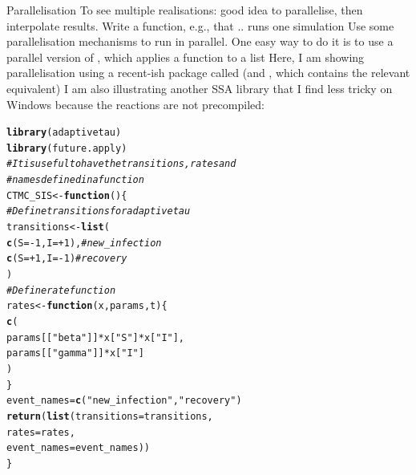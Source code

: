 \documentclass[aspectratio=169]{beamer}\usepackage[]{graphicx}\usepackage[]{xcolor}
\makeatletter
\newcommand{\hlnum}[1]{\textcolor[rgb]{0.686,0.059,0.569}{#1}}%
\newcommand{\hlsng}[1]{\textcolor[rgb]{0.192,0.494,0.8}{#1}}%
\newcommand{\hlcom}[1]{\textcolor[rgb]{0.678,0.584,0.686}{\textit{#1}}}%
\newcommand{\hlopt}[1]{\textcolor[rgb]{0,0,0}{#1}}%
\newcommand{\hldef}[1]{\textcolor[rgb]{0.345,0.345,0.345}{#1}}%
\newcommand{\hlkwa}[1]{\textcolor[rgb]{0.161,0.373,0.58}{\textbf{#1}}}%
\newcommand{\hlkwb}[1]{\textcolor[rgb]{0.69,0.353,0.396}{#1}}%
\newcommand{\hlkwc}[1]{\textcolor[rgb]{0.333,0.667,0.333}{#1}}%
\newcommand{\hlkwd}[1]{\textcolor[rgb]{0.737,0.353,0.396}{\textbf{#1}}}%
\newenvironment{kframe}{%
 \def\at@end@of@kframe{}%
 \ifinner\ifhmode%
  \def\at@end@of@kframe{\end{minipage}}%
  \begin{minipage}{\columnwidth}%
 \fi\fi%
 \def\FrameCommand##1{\hskip\@totalleftmargin \hskip-\fboxsep
 \colorbox{shadecolor}{##1}\hskip-\fboxsep
     \hskip-\linewidth \hskip-\@totalleftmargin \hskip\columnwidth}%
 \MakeFramed {\advance\hsize-\width
   \@totalleftmargin\z@ \linewidth\hsize
   \@setminipage}}%
 {\par\unskip\endMakeFramed%
 \at@end@of@kframe}
\newenvironment{knitrout}{}{} %
\makeatother
\begin{document}
\begin{frame}{Parallelisation}
    To see multiple realisations: good idea to parallelise, then interpolate results. Write a function, e.g.,   that .. runs one simulation
    \vfill
    Use some parallelisation mechanisms to run  in parallel. One easy way to do it is to use a parallel version of , which applies a function to a list
    \vfill
    Here, I am showing parallelisation using a recent-ish package called  (and , which contains the relevant  equivalent)
    \vfill
    I am also illustrating another SSA library that I find less tricky on Windows because the reactions are not precompiled: 
\end{frame}

\begin{knitrout}
\color{fgcolor}\begin{kframe}
\begin{alltt}
\hlkwd{library}\hldef{(adaptivetau)}
\hlkwd{library}\hldef{(future.apply)}
\hlcom{# It is useful to have the transitions, rates and }
\hlcom{# names defined in a function}
\hldef{CTMC_SIS} \hlkwb{<-} \hlkwa{function}\hldef{() \{}
  \hlcom{# Define transitions for adaptivetau}
  \hldef{transitions} \hlkwb{<-} \hlkwd{list}\hldef{(}
    \hlkwd{c}\hldef{(}\hlkwc{S} \hldef{=} \hlopt{-}\hlnum{1}\hldef{,} \hlkwc{I} \hldef{=} \hlopt{+}\hlnum{1}\hldef{),}  \hlcom{# new_infection}
    \hlkwd{c}\hldef{(}\hlkwc{S} \hldef{=} \hlopt{+}\hlnum{1}\hldef{,} \hlkwc{I} \hldef{=} \hlopt{-}\hlnum{1}\hldef{)}   \hlcom{# recovery}
  \hldef{)}
  \hlcom{# Define rate function}
  \hldef{rates} \hlkwb{<-} \hlkwa{function}\hldef{(}\hlkwc{x}\hldef{,} \hlkwc{params}\hldef{,} \hlkwc{t}\hldef{) \{}
    \hlkwd{c}\hldef{(}
      \hldef{params[[}\hlsng{"beta"}\hldef{]]} \hlopt{*} \hldef{x[}\hlsng{"S"}\hldef{]} \hlopt{*} \hldef{x[}\hlsng{"I"}\hldef{],}
      \hldef{params[[}\hlsng{"gamma"}\hldef{]]} \hlopt{*} \hldef{x[}\hlsng{"I"}\hldef{]}
    \hldef{)}
  \hldef{\}}
  \hldef{event_names} \hlkwb{=} \hlkwd{c}\hldef{(}\hlsng{"new_infection"}\hldef{,} \hlsng{"recovery"}\hldef{)}
  \hlkwd{return}\hldef{(}\hlkwd{list}\hldef{(}\hlkwc{transitions} \hldef{= transitions,}
              \hlkwc{rates} \hldef{= rates,}
              \hlkwc{event_names} \hldef{= event_names))}
\hldef{\}}


\end{alltt}
\end{kframe}
\end{knitrout}
\end{document}
